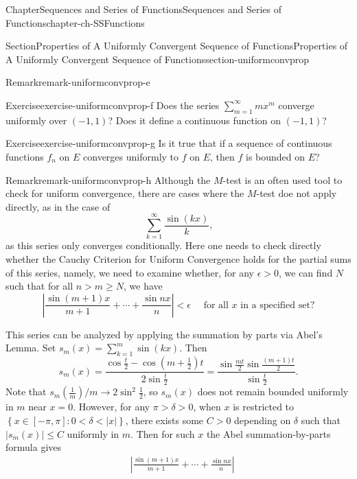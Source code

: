 \documentclass[oneside,10pt,]{book}
\numberwithin{equation}{section}
\newcommand{\amp}{&}
\begin{document}
\begin{chapterptx}{Chapter}{Sequences and Series of Functions}{}{Sequences and Series of Functions}{}{}{chapter-ch-SSFunctions}
\begin{sectionptx}{Section}{Properties of A Uniformly Convergent Sequence of Functions}{}{Properties of A Uniformly Convergent Sequence of Functions}{}{}{section-uniformconvprop}
\begin{remark}{Remark}{}{remark-uniformconvprop-e}
\end{remark}
\begin{inlineexercise}{Exercise}{}{exercise-uniformconvprop-f}%
Does  the series \(\sum_{m=1}^{\infty} m x^{m}\) converge uniformly over \((-1, 1)\)? Does it define a continuous function on \((-1, 1)\)?%
\end{inlineexercise}%
\begin{inlineexercise}{Exercise}{}{exercise-uniformconvprop-g}%
Is it true that if a sequence of continuous functions \(f_{n}\) on \(E\) converges uniformly to \(f\) on \(E\), then \(f\) is bounded on \(E\)?%
\end{inlineexercise}%
\begin{remark}{Remark}{}{remark-uniformconvprop-h}%
Although the \(M\)-test is an often used tool to check for uniform convergence, there are cases where  the \(M\)-test doe not apply directly, as in the case of%
\begin{equation*}
\sum_{k=1}^{\infty} \frac{ \sin (kx)}{k}\text{,}
\end{equation*}
as this series  only converges conditionally. Here one needs to check directly whether the Cauchy Criterion for Uniform Convergence holds for the partial sums of this series, namely, we need to examine whether, for any \(\epsilon>0\), we can find \(N\) such that for all \(n>m\ge N\), we have%
\begin{equation*}
|\frac{ \sin (m+1)x }{m+1} + \cdots + \frac{\sin nx}{n}| < \epsilon \quad \text{ for all } x \text{ in a specified set}?
\end{equation*}
%
\par
This series can be analyzed by applying the summation by parts via Abel's Lemma.  Set \(s_m(x)= \sum_{k=1}^{m}  \sin (kx)\). Then%
\begin{equation*}
s_m(x)=\frac{\cos \frac t2 -\cos \left(m+\frac 12\right) t}{2\sin \frac t2}
= \frac{\sin \frac{mt}{2} \sin \frac{(m+1)t}{2}}{\sin \frac t2}\text{.}
\end{equation*}
Note that \(s_m(\frac 1m)/m \to 2\sin^2\frac 12\), so \(s_m(x)\) does not remain bounded uniformly in \(m\) near \(x=0\). However, for any  \(\pi>\delta>0\), when \(x\) is restricted to \(\left\{x\in [-\pi, \pi]: 0 < \delta < |x|\right\}\), there exists some \(C>0\) depending on \(\delta\) such that \(\vert s_m(x)\vert \le C\) uniformly in \(m\). Then for such \(x\) the Abel summation-by-parts formula gives%
\begin{align*}
\amp |\frac{ \sin (m+1)x }{m+1} + \cdots + \frac{\sin nx}{n}| \\

\end{align*}
\end{remark}
\end{sectionptx}
\end{chapterptx}
\end{document}
